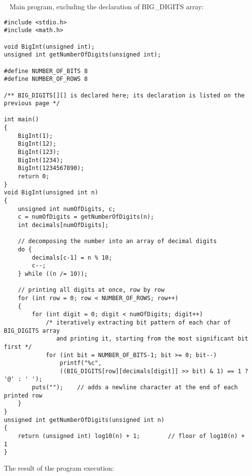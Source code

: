 \documentclass{article}
\begin{document}
	\rmfamily\
	\newline
	\noindent Main program, excluding the declaration of BIG_DIGITS array:
	
	\begin{verbatim}
#include <stdio.h>
#include <math.h>

void BigInt(unsigned int);
unsigned int getNumberOfDigits(unsigned int);

#define NUMBER_OF_BITS 8
#define NUMBER_OF_ROWS 8

/** BIG_DIGITS[][] is declared here; its declaration is listed on the previous page */

int main() 
{
    BigInt(1);
    BigInt(12);
    BigInt(123);
    BigInt(1234);
    BigInt(1234567890);
    return 0;
}
void BigInt(unsigned int n)
{
    unsigned int numOfDigits, c;
    c = numOfDigits = getNumberOfDigits(n);
    int decimals[numOfDigits];

    // decomposing the number into an array of decimal digits
    do {
        decimals[c-1] = n % 10;
        c--;
    } while ((n /= 10));

    // printing all digits at once, row by row
    for (int row = 0; row < NUMBER_OF_ROWS; row++)
    {
        for (int digit = 0; digit < numOfDigits; digit++)
            /* iteratively extracting bit pattern of each char of BIG_DIGITS array
               and printing it, starting from the most significant bit first */
            for (int bit = NUMBER_OF_BITS-1; bit >= 0; bit--)
                printf("%c", 
                ((BIG_DIGITS[row][decimals[digit]] >> bit) & 1) == 1 ? '@' : ' ');
        puts("");    // adds a newline character at the end of each printed row
    }
}
unsigned int getNumberOfDigits(unsigned int n) 
{
    return (unsigned int) log10(n) + 1;        // floor of log10(n) + 1
}
	\end{verbatim}
	
	
	\noindent The result of the program execution:
	
\end{document}
